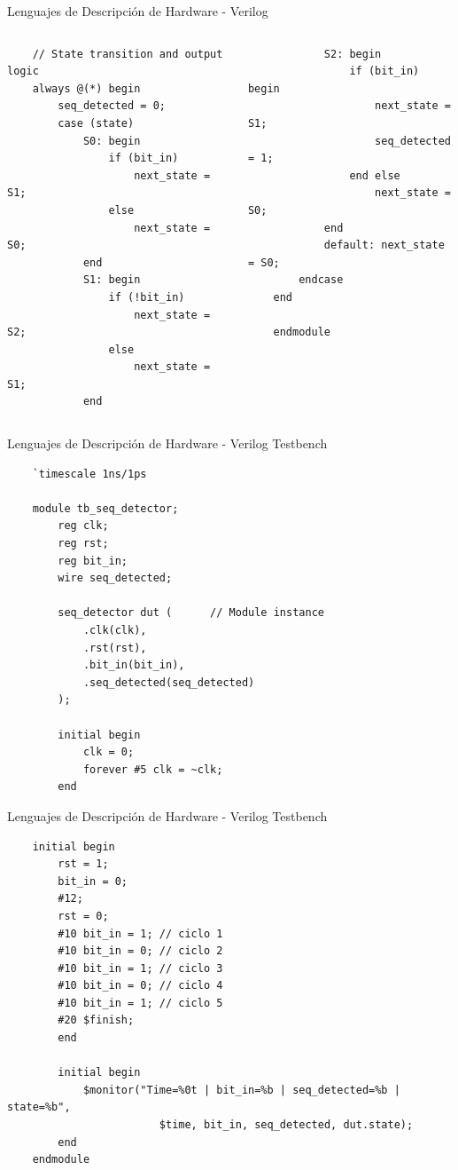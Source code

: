 \documentclass[11pt]{beamer}
\begin{document}
	\begin{frame}[fragile]{Lenguajes de Descripción de Hardware - Verilog}
	\begin{columns}[t]
	\begin{lstlisting}
	// State transition and output logic
	always @(*) begin
		seq_detected = 0;
		case (state)
			S0: begin
				if (bit_in)
					next_state = S1;
				else
					next_state = S0;
			end
			S1: begin
				if (!bit_in)
					next_state = S2;
				else
					next_state = S1;
			end
	\end{lstlisting}
	\begin{lstlisting}
			S2: begin
				if (bit_in) begin
					next_state = S1;
					seq_detected = 1;
				end else
					next_state = S0;
			end
			default: next_state = S0;
		endcase
	end
	
	endmodule
	\end{lstlisting}
	\end{columns}
	\end{frame}


	\begin{frame}[fragile]{Lenguajes de Descripción de Hardware - Verilog Testbench}
	\begin{lstlisting}
	`timescale 1ns/1ps
	
	module tb_seq_detector;
		reg clk;
		reg rst;
		reg bit_in;
		wire seq_detected;
		
		seq_detector dut (		// Module instance
			.clk(clk),
			.rst(rst),
			.bit_in(bit_in),
			.seq_detected(seq_detected)
		);
	
		initial begin
			clk = 0;
			forever #5 clk = ~clk;
		end
	\end{lstlisting}
	\end{frame}

	\begin{frame}[fragile]{Lenguajes de Descripción de Hardware - Verilog Testbench}
	\begin{lstlisting}
	initial begin
		rst = 1;
		bit_in = 0;
		#12;            
		rst = 0;
		#10 bit_in = 1; // ciclo 1
		#10 bit_in = 0; // ciclo 2
		#10 bit_in = 1; // ciclo 3  
		#10 bit_in = 0; // ciclo 4 
		#10 bit_in = 1; // ciclo 5
		#20 $finish;
		end
		
		initial begin
			$monitor("Time=%0t | bit_in=%b | seq_detected=%b | state=%b", 
						$time, bit_in, seq_detected, dut.state);
		end
	endmodule
	\end{lstlisting}
	\end{frame}
\end{document}
